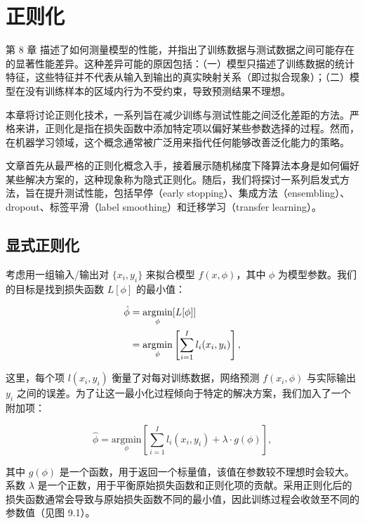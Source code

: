 \chapter{正则化}


第 8 章 描述了如何测量模型的性能，并指出了训练数据与测试数据之间可能存在的显著性能差异。这种差异可能的原因包括：（一）模型只描述了训练数据的统计特征，这些特征并不代表从输入到输出的真实映射关系（即过拟合现象）；（二）模型在没有训练样本的区域内行为不受约束，导致预测结果不理想。

本章将讨论正则化技术，一系列旨在减少训练与测试性能之间泛化差距的方法。严格来讲，正则化是指在损失函数中添加特定项以偏好某些参数选择的过程。然而，在机器学习领域，这个概念通常被广泛用来指代任何能够改善泛化能力的策略。

文章首先从最严格的正则化概念入手，接着展示随机梯度下降算法本身是如何偏好某些解决方案的，这种现象称为隐式正则化。随后，我们将探讨一系列启发式方法，旨在提升测试性能，包括早停（early stopping）、集成方法（ensembling）、dropout、标签平滑（label smoothing）和迁移学习（transfer learning）。

\section{显式正则化}

考虑用一组输入/输出对 \(\{x_i, y_i\}\) 来拟合模型 \(f(x, \phi)\)，其中 \(\phi\) 为模型参数。我们的目标是找到损失函数 \(L[\phi]\) 的最小值：


\begin{align}
	\hat{\phi} &= \underset{\phi}{\text{argmin}} [L[\phi]] \notag \\
	&= \underset{\phi}{\text{argmin}} \left[ \sum_{i=1}^I l_i(x_i, y_i) \right], 
\end{align} 


这里，每个项 \(l(x_i, y_i)\) 衡量了对每对训练数据，网络预测 \(f(x_i, \phi)\) 与实际输出 \(y_i\) 之间的误差。为了让这一最小化过程倾向于特定的解决方案，我们加入了一个附加项：

\begin{equation}
\hat{\phi} = \underset{\phi}{\text{argmin}} \left[ \sum_{i=1}^I l_i(x_i, y_i) + \lambda \cdot g(\phi) \right], 
\end{equation}

其中 \(g(\phi)\) 是一个函数，用于返回一个标量值，该值在参数较不理想时会较大。系数 \(\lambda\) 是一个正数，用于平衡原始损失函数和正则化项的贡献。采用正则化后的损失函数通常会导致与原始损失函数不同的最小值，因此训练过程会收敛至不同的参数值（见图 9.1）。

